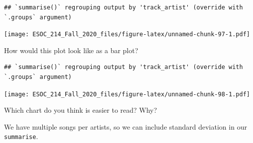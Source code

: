 \documentclass[
]{book}
\newenvironment{Shaded}{\begin{snugshade}}{\end{snugshade}}
\newcommand{\DataTypeTok}[1]{\textcolor[rgb]{0.13,0.29,0.53}{#1}}
\newcommand{\KeywordTok}[1]{\textcolor[rgb]{0.13,0.29,0.53}{\textbf{#1}}}
\newcommand{\NormalTok}[1]{#1}
\newcommand{\OperatorTok}[1]{\textcolor[rgb]{0.81,0.36,0.00}{\textbf{#1}}}
\newcommand{\StringTok}[1]{\textcolor[rgb]{0.31,0.60,0.02}{#1}}
\begin{document}
\begin{verbatim}
## `summarise()` regrouping output by 'track_artist' (override with `.groups` argument)
\end{verbatim}

\texttt{[image: ESOC\_214\_Fall\_2020\_files/figure-latex/unnamed-chunk-97-1.pdf]}

How would this plot look like as a bar plot?

\begin{Shaded}
\end{Shaded}

\begin{verbatim}
## `summarise()` regrouping output by 'track_artist' (override with `.groups` argument)
\end{verbatim}

\texttt{[image: ESOC\_214\_Fall\_2020\_files/figure-latex/unnamed-chunk-98-1.pdf]}

Which chart do you think is easier to read? Why?

We have multiple songs per artists, so we can include standard deviation in our \texttt{summarise}.

\begin{Shaded}
\end{Shaded}
\end{document}
